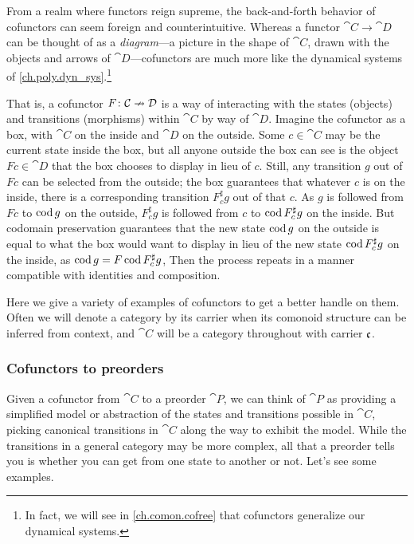\documentclass[Book-Poly]{subfiles}
\begin{document}
From a realm where functors reign supreme, the back-and-forth behavior of cofunctors can seem foreign and  counterintuitive.
Whereas a functor $\cat{C}\to\cat{D}$ can be thought of as a \emph{diagram}---a picture in the shape of $\cat{C}$, drawn with the objects and arrows of $\cat{D}$---cofunctors are much more like the dynamical systems of \cref{ch.poly.dyn_sys}.\footnote{In fact, we will see in \cref{ch.comon.cofree} that cofunctors generalize our dynamical systems.}

That is, a cofunctor $F\colon\mathcal{C}\nrightarrow\mathcal{D}$ is a way of interacting with the states (objects) and transitions (morphisms) within $\cat{C}$ by way of $\cat{D}$.
Imagine the cofunctor as a box, with $\cat{C}$ on the inside and $\cat{D}$ on the outside.
Some $c\in\cat{C}$ may be the current state inside the box, but all anyone outside the box can see is the object $Fc\in\cat{D}$ that the box chooses to display in lieu of $c$.
Still, any transition $g$ out of $Fc$ can be selected from the outside; the box guarantees that whatever $c$ is on the inside, there is a corresponding transition $F^\sharp_c g$ out of that $c$.
As $g$ is followed from $Fc$ to $\operatorname{cod} g$ on the outside, $F^\sharp_c g$ is followed from $c$ to $\operatorname{cod} F^\sharp_c g$ on the inside.
But codomain preservation guarantees that the new state $\operatorname{cod} g$ on the outside is equal to what the box would want to display in lieu of the new state $\operatorname{cod} F^\sharp_c g$ on the inside, as $\operatorname{cod} g=F\operatorname{cod} F^\sharp_c g$,
Then the process repeats in a manner compatible with identities and composition.

Here we give a variety of examples of cofunctors to get a better handle on them.
Often we will denote a category by its carrier when its comonoid structure can be inferred from context, and $\cat{C}$ will be a category throughout with carrier $\mathfrak{c}$.

\subsubsection{Cofunctors to preorders}

Given a cofunctor from $\cat{C}$ to a preorder $\cat{P}$, we can think of $\cat{P}$ as providing a simplified model or abstraction of the states and transitions possible in $\cat{C}$, picking canonical transitions in $\cat{C}$ along the way to exhibit the model.
While the transitions in a general category may be more complex, all that a preorder tells you is whether you can get from one state to another or not.
Let's see some examples.
\end{document}

